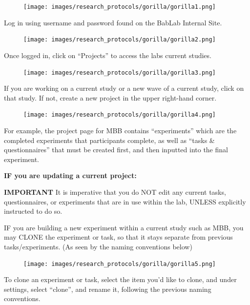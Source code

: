 \documentclass[
]{book}
\begin{document}
\begin{figure}
\centering
\texttt{[image: images/research\_protocols/gorilla/gorilla1.png]}
\caption{}
\end{figure}

Log in using username and password found on the BabLab Internal Site.

\begin{figure}
\centering
\texttt{[image: images/research\_protocols/gorilla/gorilla2.png]}
\caption{}
\end{figure}

Once logged in, click on ``Projects'' to access the labs current studies.

\begin{figure}
\centering
\texttt{[image: images/research\_protocols/gorilla/gorilla3.png]}
\caption{}
\end{figure}

If you are working on a current study or a new wave of a current study, click on that study. If not, create a new project in the upper right-hand corner.

\begin{figure}
\centering
\texttt{[image: images/research\_protocols/gorilla/gorilla4.png]}
\caption{}
\end{figure}

For example, the project page for MBB contains ``experiments'' which are the completed experiments that participants complete, as well as ``tasks \& questionnaires'' that must be created first, and then inputted into the final experiment.

\textbf{IF you are updating a current project:}

\textbf{IMPORTANT} It is imperative that you do NOT edit any current tasks, questionnaires, or experiments that are in use within the lab, UNLESS explicitly instructed to do so.

IF you are building a new experiment within a current study such as MBB, you may CLONE the experiment or task, so that it stays separate from previous tasks/experiments. (As seen by the naming conventions below)

\begin{figure}
\centering
\texttt{[image: images/research\_protocols/gorilla/gorilla5.png]}
\caption{}
\end{figure}

To clone an experiment or task, select the item you'd like to clone, and under settings, select ``clone'', and rename it, following the previous naming conventions.
\end{document}
